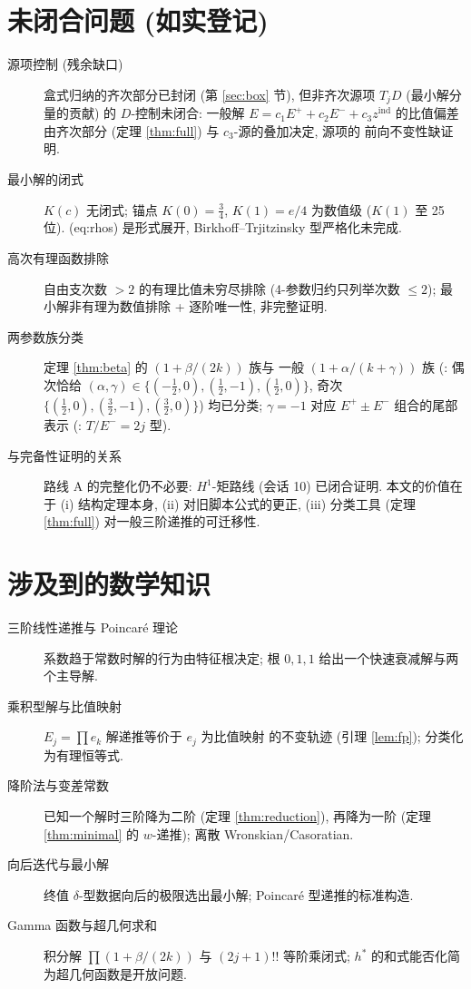 \documentclass[UTF8]{ctexart}
\begin{document}
\section{未闭合问题 (如实登记)}

\begin{description}
	\item[源项控制 (残余缺口)] 盒式归纳的齐次部分已封闭 (第 \ref{sec:box} 节),
		但非齐次源项 $T_j D$ (最小解分量的贡献) 的 $D$-控制未闭合:
		一般解 $E = c_1E^+ + c_2E^- + c_3 z^{\mathrm{ind}}$ 的比值偏差
		由齐次部分 (定理 \ref{thm:full}) 与 $c_3$-源的叠加决定, 源项的
		前向不变性缺证明.
	\item[最小解的闭式] $K(c)$ 无闭式; 锚点 $K(0) = \tfrac34$,
		$K(1) = e/4$ 为数值级 ($K(1)$ 至 25 位). (eq:rhos) 是形式展开,
		Birkhoff--Trjitzinsky 型严格化未完成.
	\item[高次有理函数排除] 自由支次数 $> 2$ 的有理比值未穷尽排除
		(4-参数归约只列举次数 $\leq 2$); 最小解非有理为数值排除 +
		逐阶唯一性, 非完整证明.
	\item[两参数族分类] 定理 \ref{thm:beta} 的 $(1+\beta/(2k))$ 族与
		一般 $(1+\alpha/(k+\gamma))$ 族 (:
		偶次恰给 $(\alpha,\gamma) \in \{(-\tfrac12,0),(\tfrac12,-1),(\tfrac12,0)\}$,
		奇次 $\{(\tfrac12,0),(\tfrac32,-1),(\tfrac32,0)\}$) 均已分类;
		$\gamma = -1$ 对应 $E^+ \pm E^-$ 组合的尾部表示
		(: $T/E^- = 2j$ 型).
	\item[与完备性证明的关系] 路线 A 的完整化仍不必要: $H^1$-矩路线 (会话 10)
		已闭合证明. 本文的价值在于 (i) 结构定理本身, (ii) 对旧脚本公式的更正,
		(iii) 分类工具 (定理 \ref{thm:full}) 对一般三阶递推的可迁移性.
\end{description}

\section{涉及到的数学知识}

\begin{description}
	\item[三阶线性递推与 Poincar\'e 理论] 系数趋于常数时解的行为由特征根决定;
		根 $0, 1, 1$ 给出一个快速衰减解与两个主导解.
	\item[乘积型解与比值映射] $E_j = \prod e_k$ 解递推等价于 $e_j$ 为比值映射
		的不变轨迹 (引理 \ref{lem:fp}); 分类化为有理恒等式.
	\item[降阶法与变差常数] 已知一个解时三阶降为二阶 (定理 \ref{thm:reduction}),
		再降为一阶 (定理 \ref{thm:minimal} 的 $w$-递推); 离散 Wronskian/Casoratian.
	\item[向后迭代与最小解] 终值 $\delta$-型数据向后的极限选出最小解;
		Poincar\'e 型递推的标准构造.
	\item[Gamma 函数与超几何求和] 积分解 $\prod(1+\beta/(2k))$ 与
		$(2j+1)!!$ 等阶乘闭式; $h^*$ 的和式能否化简为超几何函数是开放问题.
\end{description}
\end{document}
